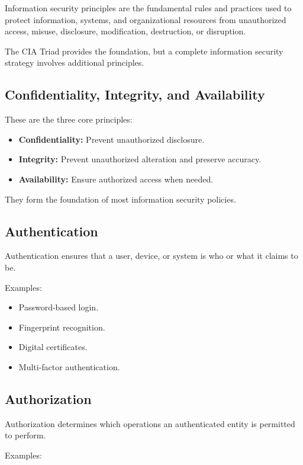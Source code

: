 Information security principles are the fundamental rules and practices used to protect information, systems, and organizational resources from unauthorized access, misuse, disclosure, modification, destruction, or disruption.

The CIA Triad provides the foundation, but a complete information security strategy involves additional principles.

\subsection{Confidentiality, Integrity, and Availability}

These are the three core principles:

\begin{itemize}
\item \textbf{Confidentiality:} Prevent unauthorized disclosure.
\item \textbf{Integrity:} Prevent unauthorized alteration and preserve accuracy.
\item \textbf{Availability:} Ensure authorized access when needed.
\end{itemize}

They form the foundation of most information security policies.

\subsection{Authentication}

Authentication ensures that a user, device, or system is who or what it claims to be.

Examples:

\begin{itemize}
\item Password-based login.
\item Fingerprint recognition.
\item Digital certificates.
\item Multi-factor authentication.
\end{itemize}

\subsection{Authorization}

Authorization determines which operations an authenticated entity is permitted to perform.

Examples:

